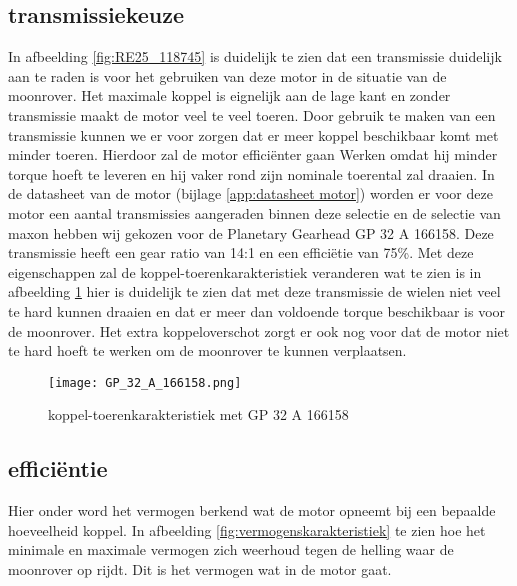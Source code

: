 \subsection{transmissiekeuze}
In afbeelding \ref{fig:RE25_118745} is duidelijk te zien dat een transmissie duidelijk aan te raden is voor het gebruiken van deze motor in de situatie van de moonrover. Het maximale koppel is eignelijk aan de lage kant en zonder transmissie maakt de motor veel te veel toeren. Door gebruik te maken van een transmissie kunnen we er voor zorgen dat er meer koppel beschikbaar komt met minder toeren. Hierdoor zal de motor efficiënter gaan Werken omdat hij minder torque hoeft te leveren en hij vaker rond zijn nominale toerental zal draaien. In de datasheet van de  motor (bijlage \ref{app:datasheet motor}) worden er voor deze motor een aantal transmissies aangeraden binnen deze selectie en de selectie van maxon hebben wij gekozen voor de Planetary Gearhead GP 32 A 166158. Deze transmissie heeft een gear ratio van 14:1 en een efficiëtie van 75\%. Met deze eigenschappen zal de koppel-toerenkarakteristiek veranderen wat te zien is in afbeelding \ref{fig:GP 32 A 166158} hier is duidelijk te zien dat met deze transmissie de wielen niet veel te hard kunnen draaien en dat er meer dan voldoende torque beschikbaar is voor de moonrover. Het extra koppeloverschot zorgt er ook nog voor dat de motor niet te hard hoeft te werken om de moonrover te kunnen verplaatsen.

        \begin{figure}[H]
                \centering
                \texttt{[image: GP\_32\_A\_166158.png]}
                \caption{koppel-toerenkarakteristiek met GP 32 A 166158}
                \label{fig:GP 32 A 166158}
        \end{figure}

\subsection{efficiëntie}

Hier onder word het vermogen berkend wat de motor opneemt bij een bepaalde hoeveelheid koppel. In afbeelding \ref{fig:vermogenskarakteristiek} te zien hoe het minimale en maximale vermogen zich weerhoud tegen de helling waar de moonrover op rijdt. Dit is het vermogen wat in de motor gaat.

